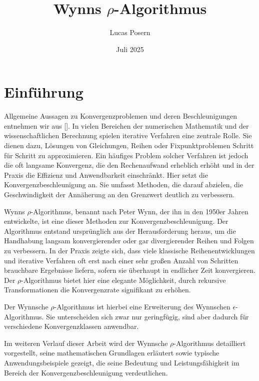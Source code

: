 \documentclass[a4paper,12pt]{article}
\title{{Wynns $\rho$-Algorithmus}}
\author{Lucas Posern}
\date{Juli 2025}
\numberwithin{equation}{section}
\theoremstyle{remark}
\begin{document}
\maketitle
\thispagestyle{empty}
\newpage
\thispagestyle{empty}
\tableofcontents
\newpage
{} %
\setcounter{page}{1}   



\section{Einführung}\label{sec:einleitung}
Allgemeine Aussagen zu Konvergenzproblemen und deren Beschleunigungen entnehmen wir aus [\cite[194-199]{weniger1996nonlinear}].
In vielen Bereichen der numerischen Mathematik und der wissenschaftlichen Berechnung spielen iterative Verfahren eine zentrale Rolle. Sie dienen dazu, Lösungen von Gleichungen, Reihen oder Fixpunktproblemen Schritt für Schritt zu approximieren. Ein häufiges Problem solcher Verfahren ist jedoch die oft langsame Konvergenz, die den Rechenaufwand erheblich erhöht und in der Praxis die Effizienz und Anwendbarkeit einschränkt. Hier setzt die Konvergenzbeschleunigung an. Sie umfasst Methoden, die darauf abzielen, die Geschwindigkeit der Annäherung an den Grenzwert deutlich zu verbessern.

Wynns $\rho$-Algorithmus, benannt nach Peter Wynn, der ihn in den 1950er Jahren entwickelte, ist eine dieser Methoden zur Konvergenzbeschleunigung. Der Algorithmus entstand ursprünglich aus der Herausforderung heraus, um die Handhabung langsam konvergierender oder gar divergierender Reihen und Folgen zu verbessern. In der Praxis zeigte sich, dass viele klassische Reihenentwicklungen und iterative Verfahren oft erst nach einer sehr großen Anzahl von Schritten brauchbare Ergebnisse liefern, sofern sie überhaupt in endlicher Zeit konvergieren. Der $\rho$-Algorithmus bietet hier eine elegante Möglichkeit, durch rekursive Transformationen die Konvergenzrate signifikant zu erhöhen.

Der Wynnsche $\rho$-Algorithmus ist hierbei eine Erweiterung des Wynnschen $\epsilon$-Algorithmus. Sie unterscheiden sich zwar nur geringfügig, sind aber dadurch für verschiedene Konvergenzklassen anwendbar.

Im weiteren Verlauf dieser Arbeit wird der Wynnsche $\rho$-Algorithmus detailliert vorgestellt, seine mathematischen Grundlagen erläutert sowie typische Anwendungsbeispiele gezeigt, die seine Bedeutung und Leistungsfähigkeit im Bereich der Konvergenzbeschleunigung verdeutlichen.
\end{document}
